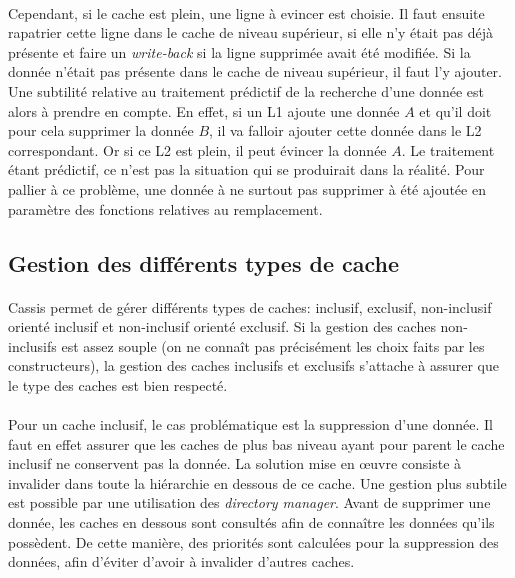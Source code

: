\paragraph{}
Cependant, si le cache est plein, une ligne à evincer est choisie. Il faut ensuite rapatrier cette ligne dans le cache de niveau supérieur, si elle n'y était pas déjà présente et faire un \emph{write-back} si la ligne supprimée avait été modifiée. Si la donnée n'était pas présente dans le cache de niveau supérieur, il faut l'y ajouter. Une subtilité relative au traitement prédictif de la recherche d'une donnée est alors à prendre en compte. En effet, si un L1 ajoute une donnée $A$ et qu'il doit pour cela supprimer la donnée $B$, il va falloir ajouter cette donnée dans le L2 correspondant. Or si ce L2 est plein, il peut évincer la donnée $A$. Le traitement étant prédictif, ce n'est pas la situation qui se produirait dans la réalité. Pour pallier à ce problème, une donnée à ne surtout pas supprimer à été ajoutée en paramètre des fonctions relatives au remplacement.


\subsection{Gestion des différents types de cache}
\paragraph{}
\textsf{Cassis} permet de gérer différents types de caches: inclusif, exclusif, non-inclusif orienté inclusif et non-inclusif orienté exclusif. Si la gestion des caches non-inclusifs est assez souple (on ne connaît pas précisément les choix faits par les constructeurs), la gestion des caches inclusifs et exclusifs s'attache à assurer que le type des caches est bien respecté.

\paragraph{}
Pour un cache inclusif, le cas problématique est la suppression d'une donnée. Il faut en effet assurer que les caches de plus bas niveau ayant pour parent le cache inclusif ne conservent pas la donnée. La solution mise en {\oe}uvre consiste à invalider dans toute la hiérarchie en dessous de ce cache. Une gestion plus subtile est possible par une utilisation des \emph{directory manager}. Avant de supprimer une donnée, les caches en dessous sont consultés afin de connaître les données qu'ils possèdent. De cette manière, des priorités sont calculées pour la suppression des données, afin d'éviter d'avoir à invalider d'autres caches.

